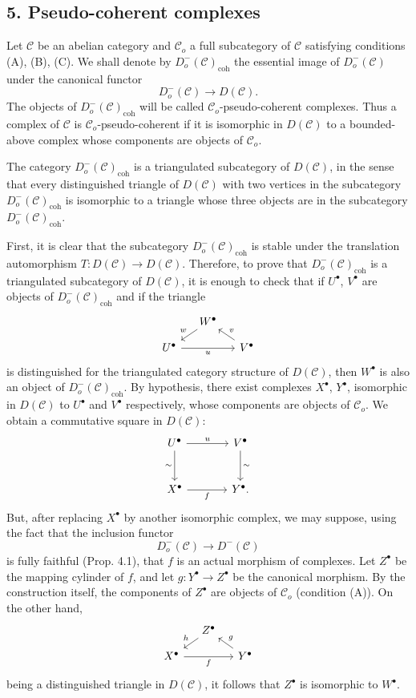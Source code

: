 \documentclass[11pt]{article}
\providecommand{\coh}{\mathrm{coh}}
\providecommand{\cC}{\mathcal C}
\providecommand{\cC}{\mathcal C}
\providecommand{\coh}{\mathrm{coh}}
\begin{document}
\subsection*{5. Pseudo-coherent complexes}

Let $\cC$ be an abelian category and $\cC_o$ a full subcategory of $\cC$ satisfying conditions (A), (B), (C). We shall denote by $D_o^-(\cC)_{\coh}$ the essential image of $D_o^-(\cC)$ under the canonical functor
\[
D_o^-(\cC)\longrightarrow D(\cC).
\]
The objects of $D_o^-(\cC)_{\coh}$ will be called $\cC_o$-pseudo-coherent complexes. Thus a complex of $\cC$ is $\cC_o$-pseudo-coherent if it is isomorphic in $D(\cC)$ to a bounded-above complex whose components are objects of $\cC_o$.

The category $D_o^-(\cC)_{\coh}$ is a triangulated subcategory of $D(\cC)$, in the sense that every distinguished triangle of $D(\cC)$ with two vertices in the subcategory $D_o^-(\cC)_{\coh}$ is isomorphic to a triangle whose three objects are in the subcategory $D_o^-(\cC)_{\coh}$.

First, it is clear that the subcategory $D_o^-(\cC)_{\coh}$ is stable under the translation automorphism $T:D(\cC)\to D(\cC)$. Therefore, to prove that $D_o^-(\cC)_{\coh}$ is a triangulated subcategory of $D(\cC)$, it is enough to check that if $U^\bullet$, $V^\bullet$ are objects of $D_o^-(\cC)_{\coh}$ and if the triangle
\[
\begin{tikzcd}[column sep=small,row sep=small]
& W^\bullet \arrow[dl,"w"']\\
U^\bullet \arrow[rr,"u"']&& V^\bullet \arrow[ul,"v"']
\end{tikzcd}
\]
is distinguished for the triangulated category structure of $D(\cC)$, then $W^\bullet$ is also an object of $D_o^-(\cC)_{\coh}$. By hypothesis, there exist complexes $X^\bullet$, $Y^\bullet$, isomorphic in $D(\cC)$ to $U^\bullet$ and $V^\bullet$ respectively, whose components are objects of $\cC_o$. We obtain a commutative square in $D(\cC)$:
\[
\begin{tikzcd}[column sep=large,row sep=large]
U^\bullet \arrow[r,"u"] \arrow[d,"\sim"']&V^\bullet \arrow[d,"\sim"]\\
X^\bullet \arrow[r,"f"']&Y^\bullet .
\end{tikzcd}
\]
But, after replacing $X^\bullet$ by another isomorphic complex, we may suppose, using the fact that the inclusion functor
\[
D_o^-(\cC)\longrightarrow D^-(\cC)
\]
is fully faithful (Prop. 4.1), that $f$ is an actual morphism of complexes. Let $Z^\bullet$ be the mapping cylinder of $f$, and let $g:Y^\bullet\to Z^\bullet$ be the canonical morphism. By the construction itself, the components of $Z^\bullet$ are objects of $\cC_o$ (condition (A)). On the other hand,
\[
\begin{tikzcd}[column sep=small,row sep=small]
&Z^\bullet \arrow[dl,"h"']\\
X^\bullet \arrow[rr,"f"']&&Y^\bullet \arrow[ul,"g"']
\end{tikzcd}
\]
being a distinguished triangle in $D(\cC)$, it follows that $Z^\bullet$ is isomorphic to $W^\bullet$.
\end{document}
